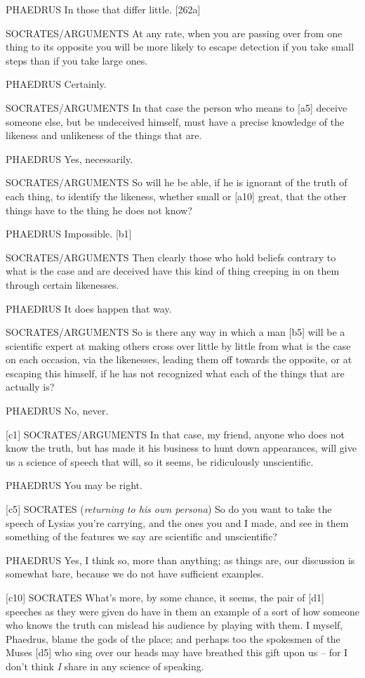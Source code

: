 PHAEDRUS In those that differ little. {[}262a{]}

SOCRATES/ARGUMENTS At any rate, when you are passing over from one thing
to its opposite you will be more likely to escape detection if you take
small steps than if you take large ones.

PHAEDRUS Certainly.

SOCRATES/ARGUMENTS In that case the person who means to {[}a5{]} deceive
someone else, but be undeceived himself, must have a precise knowledge
of the likeness and unlikeness of the things that
are.

PHAEDRUS Yes, necessarily.

SOCRATES/ARGUMENTS So will he be able, if he is ignorant of the truth of
each thing, to identify the likeness, whether small or {[}a10{]} great,
that the other things have to the thing he does not know?

PHAEDRUS Impossible. {[}b1{]}

SOCRATES/ARGUMENTS Then clearly those who hold beliefs contrary to what
is the case and are deceived have this kind of thing creeping in on them
through certain likenesses.

PHAEDRUS It does happen that way.

SOCRATES/ARGUMENTS So is there any way in which a man {[}b5{]} will be a
scientific expert at making others cross over little by little from what
is the case on each occasion, via the likenesses, leading them off
towards the opposite, or at escaping this himself, if he has not
recognized what each of the things that are actually is?

PHAEDRUS No, never.

{[}c1{]} SOCRATES/ARGUMENTS In that case, my friend, anyone who does not
know the truth, but has made it his business to hunt down appearances,
will give us a science of speech that will, so it seems, be ridiculously
unscientific.

PHAEDRUS You may be right.

{[}c5{]} SOCRATES ({\em returning to his own persona}) So do you want to
take the speech of Lysias you're carrying, and the ones you and I
made, and see in them
something of the features we say are scientific and unscientific?

PHAEDRUS Yes, I think so, more than anything; as things are, our
discussion is somewhat bare, because we do not have sufficient examples.

{[}c10{]} SOCRATES What's more, by some chance, it seems, the pair of
{[}d1{]} speeches as
they were given do have in them an example of a sort of how someone who
knows the truth can mislead his audience by playing with
them. I myself,
Phaedrus, blame the gods of the place; and perhaps too the spokesmen of
the Muses {[}d5{]} who sing over our heads may have breathed this gift
upon us -- for I don't think {\em I} share in any science of speaking.

